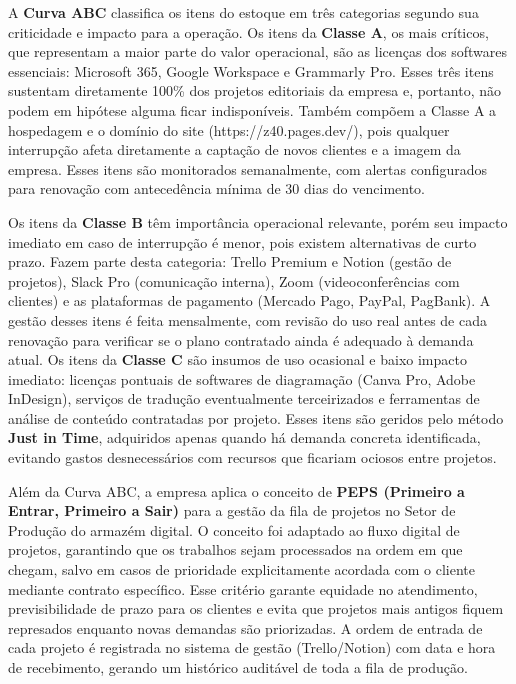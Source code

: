\documentclass[10pt,a4paper]{article}
\newcommand{\zsiteplain}{https://\allowbreak{}z40.pages\allowbreak{}.dev/\allowbreak{}}
\begin{document}
A \textbf{Curva ABC} classifica os itens do estoque em três categorias segundo sua criticidade e impacto para a operação. Os itens da \textbf{Classe A}, os mais críticos, que representam a maior parte do valor operacional, são as licenças dos softwares essenciais: Microsoft 365, Google Workspace e Grammarly Pro. Esses três itens sustentam diretamente 100\% dos projetos editoriais da empresa e, portanto, não podem em hipótese alguma ficar indisponíveis. Também compõem a Classe A a hospedagem e o domínio do site (\zsiteplain{}), pois qualquer interrupção afeta diretamente a captação de novos clientes e a imagem da empresa. Esses itens são monitorados semanalmente, com alertas configurados para renovação com antecedência mínima de 30 dias do vencimento.

Os itens da \textbf{Classe B} têm importância operacional relevante, porém seu impacto imediato em caso de interrupção é menor, pois existem alternativas de curto prazo. Fazem parte desta categoria: Trello Premium e Notion (gestão de projetos), Slack Pro (comunicação interna), Zoom (videoconferências com clientes) e as plataformas de pagamento (Mercado Pago, PayPal, PagBank). A gestão desses itens é feita mensalmente, com revisão do uso real antes de cada renovação para verificar se o plano contratado ainda é adequado à demanda atual. Os itens da \textbf{Classe C} são insumos de uso ocasional e baixo impacto imediato: licenças pontuais de softwares de diagramação (Canva Pro, Adobe InDesign), serviços de tradução eventualmente terceirizados e ferramentas de análise de conteúdo contratadas por projeto. Esses itens são geridos pelo método \textbf{Just in Time}, adquiridos apenas quando há demanda concreta identificada, evitando gastos desnecessários com recursos que ficariam ociosos entre projetos.

Além da Curva ABC, a empresa aplica o conceito de \textbf{PEPS (Primeiro a Entrar, Primeiro a Sair)} para a gestão da fila de projetos no Setor de Produção do armazém digital. O conceito foi adaptado ao fluxo digital de projetos, garantindo que os trabalhos sejam processados na ordem em que chegam, salvo em casos de prioridade explicitamente acordada com o cliente mediante contrato específico. Esse critério garante equidade no atendimento, previsibilidade de prazo para os clientes e evita que projetos mais antigos fiquem represados enquanto novas demandas são priorizadas. A ordem de entrada de cada projeto é registrada no sistema de gestão (Trello/Notion) com data e hora de recebimento, gerando um histórico auditável de toda a fila de produção.
\end{document}
